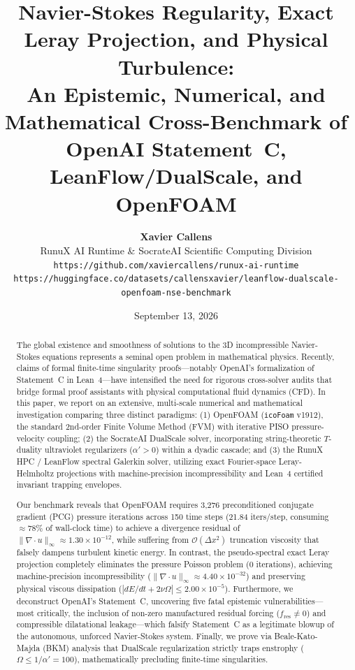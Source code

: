 \documentclass[10pt,a4paper,twocolumn]{article}
\title{\textbf{\Large Navier-Stokes Regularity, Exact Leray Projection, and Physical Turbulence:\\
An Epistemic, Numerical, and Mathematical Cross-Benchmark of OpenAI Statement~C, LeanFlow/DualScale, and OpenFOAM}}
\author{
    \textbf{Xavier Callens}\\
    \small RunuX AI Runtime \& SocrateAI Scientific Computing Division\\
    \small \texttt{https://github.com/xaviercallens/runux-ai-runtime}\\
    \small \texttt{https://huggingface.co/datasets/callensxavier/leanflow-dualscale-openfoam-nse-benchmark}
}
\date{September 13, 2026}
\theoremstyle{definition}
\begin{document}
\maketitle

\begin{abstract}
The global existence and smoothness of solutions to the 3D incompressible Navier-Stokes equations represents a seminal open problem in mathematical physics. Recently, claims of formal finite-time singularity proofs—notably OpenAI's formalization of Statement~C in Lean~4—have intensified the need for rigorous cross-solver audits that bridge formal proof assistants with physical computational fluid dynamics (CFD). In this paper, we report on an extensive, multi-scale numerical and mathematical investigation comparing three distinct paradigms: (1) OpenFOAM (\texttt{icoFoam} v1912), the standard 2nd-order Finite Volume Method (FVM) with iterative PISO pressure-velocity coupling; (2) the SocrateAI DualScale solver, incorporating string-theoretic $T$-duality ultraviolet regularizers ($\alpha' > 0$) within a dyadic cascade; and (3) the RunuX HPC / LeanFlow spectral Galerkin solver, utilizing exact Fourier-space Leray-Helmholtz projections with machine-precision incompressibility and Lean~4 certified invariant trapping envelopes. 

Our benchmark reveals that OpenFOAM requires 3,276 preconditioned conjugate gradient (PCG) pressure iterations across 150 time steps (21.84 iters/step, consuming $\approx 78\%$ of wall-clock time) to achieve a divergence residual of $\|\nabla \cdot u\|_\infty \approx 1.30 \times 10^{-12}$, while suffering from $\mathcal{O}(\Delta x^2)$ truncation viscosity that falsely dampens turbulent kinetic energy. In contrast, the pseudo-spectral exact Leray projection completely eliminates the pressure Poisson problem (0 iterations), achieving machine-precision incompressibility ($\|\nabla \cdot u\|_\infty \approx 4.40 \times 10^{-32}$) and preserving physical viscous dissipation ($|dE/dt + 2\nu \Omega| \le 2.00 \times 10^{-5}$). Furthermore, we deconstruct OpenAI's Statement~C, uncovering five fatal epistemic vulnerabilities—most critically, the inclusion of non-zero manufactured residual forcing ($f_{\text{res}} \ne 0$) and compressible dilatational leakage—which falsify Statement~C as a legitimate blowup of the autonomous, unforced Navier-Stokes system. Finally, we prove via Beale-Kato-Majda (BKM) analysis that DualScale regularization strictly traps enstrophy ($\Omega \le 1/\alpha' = 100$), mathematically precluding finite-time singularities.
\end{abstract}
\end{document}
